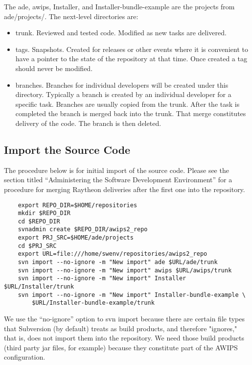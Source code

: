 The ade, awips, Installer, and Installer-bundle-example are the
projects from ade/projects/.  The next-level directories are:
\begin{itemize}
\item
trunk.  Reviewed and tested code.  Modified as new tasks are delivered.
\item
tags.  Snapshots.  Created for releases or other events where it is
convenient to have a pointer to the state of the repository at that
time.  Once created a tag should never be modified.
\item
branches.  Branches for individual developers will be created under
this directory.  Typically a branch is created by an individual 
developer for a specific task.  Branches are usually copied from the
trunk.  After the task is completed the branch is merged back into the
trunk.  That merge constitutes delivery of the code.  The branch is 
then deleted.
\end{itemize}


\subsection{Import the Source Code}

The procedure below is for initial import of the source code. 
Please see the section titled ``Administering the Software
Development Environment'' for a procedure for merging 
Raytheon deliveries after the first one into the repository.

\begin{verbatim}
    export REPO_DIR=$HOME/repositories
    mkdir $REPO_DIR
    cd $REPO_DIR
    svnadmin create $REPO_DIR/awips2_repo
    export PRJ_SRC=$HOME/ade/projects
    cd $PRJ_SRC
    export URL=file:///home/swenv/repositories/awips2_repo
    svn import --no-ignore -m "New import" ade $URL/ade/trunk
    svn import --no-ignore -m "New import" awips $URL/awips/trunk
    svn import --no-ignore -m "New import" Installer $URL/Installer/trunk
    svn import --no-ignore -m "New import" Installer-bundle-example \
        $URL/Installer-bundle-example/trunk
\end{verbatim}

We use the ``no-ignore'' option to svn import because there are certain
file types that Subversion (by default) treats as build products, and
therefore "ignores,"  that is, does not import them into the repository.
We need those build products (third party jar files, for example)
because they constitute part of the AWIPS configuration.

